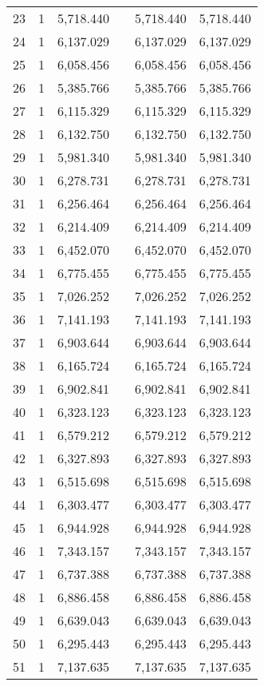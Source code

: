 \begin{table}[!htbp]
\begin{tabular}{@{\extracolsep{5pt}}lccccc}
23 & 1 & 5,718.440 &  & 5,718.440 & 5,718.440 \\ 
24 & 1 & 6,137.029 &  & 6,137.029 & 6,137.029 \\ 
25 & 1 & 6,058.456 &  & 6,058.456 & 6,058.456 \\ 
26 & 1 & 5,385.766 &  & 5,385.766 & 5,385.766 \\ 
27 & 1 & 6,115.329 &  & 6,115.329 & 6,115.329 \\ 
28 & 1 & 6,132.750 &  & 6,132.750 & 6,132.750 \\ 
29 & 1 & 5,981.340 &  & 5,981.340 & 5,981.340 \\ 
30 & 1 & 6,278.731 &  & 6,278.731 & 6,278.731 \\ 
31 & 1 & 6,256.464 &  & 6,256.464 & 6,256.464 \\ 
32 & 1 & 6,214.409 &  & 6,214.409 & 6,214.409 \\ 
33 & 1 & 6,452.070 &  & 6,452.070 & 6,452.070 \\ 
34 & 1 & 6,775.455 &  & 6,775.455 & 6,775.455 \\ 
35 & 1 & 7,026.252 &  & 7,026.252 & 7,026.252 \\ 
36 & 1 & 7,141.193 &  & 7,141.193 & 7,141.193 \\ 
37 & 1 & 6,903.644 &  & 6,903.644 & 6,903.644 \\ 
38 & 1 & 6,165.724 &  & 6,165.724 & 6,165.724 \\ 
39 & 1 & 6,902.841 &  & 6,902.841 & 6,902.841 \\ 
40 & 1 & 6,323.123 &  & 6,323.123 & 6,323.123 \\ 
41 & 1 & 6,579.212 &  & 6,579.212 & 6,579.212 \\ 
42 & 1 & 6,327.893 &  & 6,327.893 & 6,327.893 \\ 
43 & 1 & 6,515.698 &  & 6,515.698 & 6,515.698 \\ 
44 & 1 & 6,303.477 &  & 6,303.477 & 6,303.477 \\ 
45 & 1 & 6,944.928 &  & 6,944.928 & 6,944.928 \\ 
46 & 1 & 7,343.157 &  & 7,343.157 & 7,343.157 \\ 
47 & 1 & 6,737.388 &  & 6,737.388 & 6,737.388 \\ 
48 & 1 & 6,886.458 &  & 6,886.458 & 6,886.458 \\ 
49 & 1 & 6,639.043 &  & 6,639.043 & 6,639.043 \\ 
50 & 1 & 6,295.443 &  & 6,295.443 & 6,295.443 \\ 
51 & 1 & 7,137.635 &  & 7,137.635 & 7,137.635 \\ 

\end{tabular}
\end{table}
